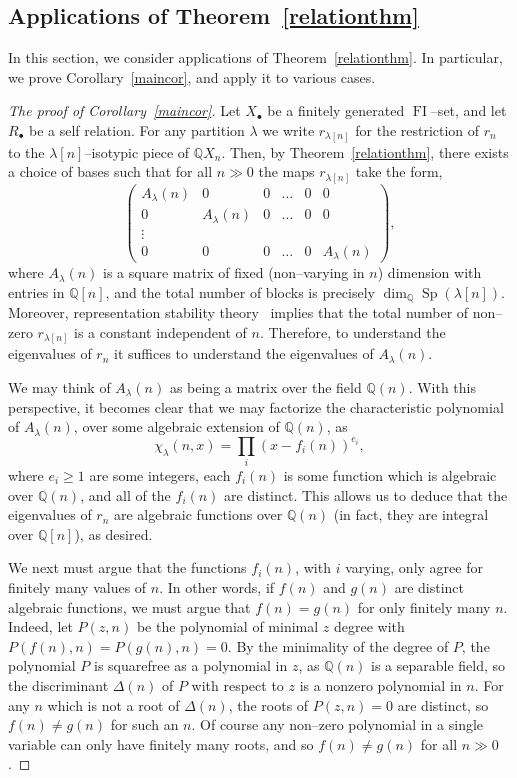 \documentclass[ALCO,ThmDefs,Unicode,epreuves]{cedram}
\DeclareMathOperator{\FI}{FI}
\DeclareMathOperator{\Sp}{Sp}
\newcommand{\Q}{\mathbb{Q}}
\newcommand{\dt}{\bullet}
\begin{document}
\subsection{Applications of Theorem~\ref{relationthm}}
\label{mainapp}
In this section, we consider applications of Theorem~\ref{relationthm}. In particular, we prove Corollary~\ref{maincor}, and apply it to various cases.

\begin{proof}[The proof of Corollary~\ref{maincor}]
Let $X_\dt$ be a finitely generated $\FI$--set, and let $R_\dt$ be a self relation. For any partition $\lambda$ we write $r_{\lambda[n]}$ for the restriction of $r_n$ to the $\lambda[n]$--isotypic piece of $\Q X_n$. Then, by Theorem~\ref{relationthm}, there exists a choice of bases such that for all $n \gg 0$ the maps $r_{\lambda[n]}$ take the form,
\[
\begin{pmatrix}
A_\lambda(n)& 0& 0 &\dots & 0& 0\\
0 & A_\lambda(n) & 0 &\dots & 0 &0\\
\vdots\\
0 & 0 & 0 &\dots& 0 & A_{\lambda}(n)
\end{pmatrix},
\]
where $A_{\lambda}(n)$ is a square matrix of fixed (non--varying in $n$) dimension with entries in $\Q[n]$, and the total number of blocks is precisely $\dim_\Q \Sp(\lambda[n])$. Moreover, representation stability theory~\cite{CEF} implies that the total number of non--zero $r_{\lambda[n]}$ is a constant independent of $n$. Therefore, to understand the eigenvalues of $r_{n}$ it suffices to understand the eigenvalues of $A_\lambda(n)$.

We may think of $A_\lambda(n)$ as being a matrix over the field $\Q(n)$. With this perspective, it becomes clear that we may factorize the characteristic polynomial of $A_\lambda(n)$, over some algebraic extension of $\Q(n)$, as
\[
\chi_{\lambda}(n,x) = \prod_i (x-f_i(n))^{e_i},
\]
where $e_i \geq 1$ are some integers, each $f_i(n)$ is some function which is algebraic over $\Q(n)$, and all of the $f_i(n)$ are distinct. This allows us to deduce that the eigenvalues of $r_n$ are algebraic functions over $\Q(n)$ (in fact, they are integral over $\Q[n]$), as desired.

We next must argue that the functions $f_i(n)$, with $i$ varying, only agree for finitely many values of $n$. In other words, if $f(n)$ and $g(n)$ are distinct algebraic functions, we must argue that $f(n)=g(n)$ for only finitely many $n$. Indeed, let $P(z,n)$ be the polynomial of minimal $z$ degree with $P(f(n), n) = P(g(n), n) = 0$. 
By the minimality of the degree of $P$, the polynomial $P$ is squarefree as a polynomial in $z$, as $\Q(n)$ is a separable field, so the discriminant $\Delta(n)$ of $P$ with respect to $z$ is a nonzero polynomial in $n$. For any $n$ which is not a root of $\Delta(n)$, the roots of $P(z,n)=0$ are distinct, so $f(n) \neq g(n)$ for such an $n$. Of course any non--zero polynomial in a single variable can only have finitely many roots, and so $f(n) \neq g(n)$ for all $n \gg 0$.


\end{proof}
\end{document}

